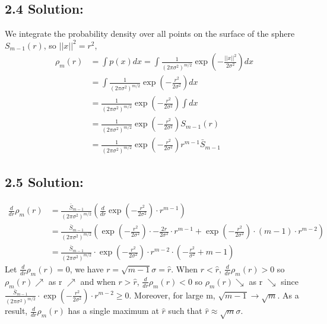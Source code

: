 \documentclass{article}
\begin{document}
\subsection*{2.4 Solution:}
We integrate the probability density over all points on the surface of the sphere $S_{m-1}(r)$, so $||x||^2 = r^2$, 
\begin{align*}
    \rho_m(r) &= \int p(x) dx = \int \frac{1}{(2\pi\sigma^2)^{m/2}}\exp(-\frac{||x||^2}{2\sigma^2})dx \\
              &= \int \frac{1}{(2\pi\sigma^2)^{m/2}}\exp(-\frac{r^2}{2\sigma^2})dx \\
              &= \frac{1}{(2\pi\sigma^2)^{m/2}}\exp(-\frac{r^2}{2\sigma^2}) \int dx \\
              &= \frac{1}{(2\pi\sigma^2)^{m/2}}\exp(-\frac{r^2}{2\sigma^2}) S_{m-1}(r) \\ 
              &= \frac{1}{(2\pi\sigma^2)^{m/2}}\exp(-\frac{r^2}{2\sigma^2}) r^{m-1} \bar{S}_{m-1}
\end{align*}

\subsection*{2.5 Solution:}
\begin{align*}
    \frac{d}{dr}\rho_m(r)&=\frac{\bar{S}_{m-1}}{(2\pi\sigma^2)^{m/2}}\left(\frac{d}{dr}\exp(-\frac{r^2}{2\sigma^2})\cdot r^{m-1}\right)\\
    &=\frac{\bar{S}_{m-1}}{(2\pi\sigma^2)^{m/2}}\left(\exp(-\frac{r^2}{2\sigma^2})\cdot -\frac{2r}{2\sigma^2}\cdot r^{m-1}+\exp(-\frac{r^2}{2\sigma^2})\cdot(m-1)\cdot r^{m-2}\right)\\
    &=\frac{\bar{S}_{m-1}}{(2\pi\sigma^2)^{m/2}}\cdot \exp(-\frac{r^2}{2\sigma^2})\cdot r^{m-2}\cdot\left(-\frac{r^2}{\sigma^2} + m - 1\right)
\end{align*}
Let $\frac{d}{dr}\rho_m(r) = 0$, we have $r = \sqrt{m-1} \sigma = \hat{r}$. When $r < \hat{r}$, $\frac{d}{dr}\rho_m(r) > 0$ so $\rho_m(r) \nearrow$ as r $\nearrow$ and when $r > \hat{r}$, $\frac{d}{dr}\rho_m(r) < 0$ so $\rho_m(r) \searrow$ as r $\searrow$
since $\frac{\bar{S}_{m-1}}{(2\pi\sigma^2)^{m/2}}\cdot \exp(-\frac{r^2}{2\sigma^2})\cdot r^{m-2} \geq 0$. Moreover, for large m, $\sqrt{m-1} \to \sqrt{m}$. As a result, $\frac{d}{dr}\rho_m(r)$ has a single maximum at $\hat{r}$ such that $\hat{r} \approx \sqrt{m} \sigma$.
\end{document}
